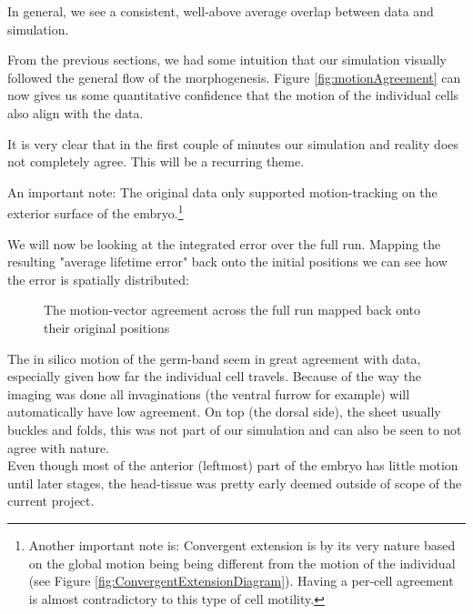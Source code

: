 In general, we see a consistent, well-above average overlap between data and simulation. 

From the previous sections, we had some intuition that our simulation visually followed the general flow of the morphogenesis. Figure \ref{fig:motionAgreement} can now   gives us some quantitative confidence that the motion of the individual cells also align with the data.

It is very clear that in the first couple of minutes our simulation and reality does not completely agree. This will be a recurring theme.

An important note: The original data only supported motion-tracking on the exterior surface of the embryo.\footnote{Another important note is: Convergent extension is by its very nature based on the global motion being being different from the motion of the individual (see Figure \ref{fig:ConvergentExtensionDiagram}). Having a per-cell agreement is almost contradictory to this type of cell motility. 
}

We will now be looking at the integrated error over the full run. Mapping the resulting "average lifetime error" back onto the initial positions we can see how the error is spatially distributed:
\begin{figure}[H]
    \centering
    \caption{The motion-vector agreement across the full run mapped back onto their original positions }
    \label{fig:}
\end{figure}

The in silico motion of the germ-band seem in great agreement with data, especially given how far the individual cell travels.
Because of the way the imaging was done all invaginations (the ventral furrow for example) will automatically have low agreement.
On top (the dorsal side), the sheet usually buckles and folds, this was not part of our simulation and can also be seen to not agree with nature. \\
Even though most of the anterior (leftmost) part of the embryo has little motion until later stages, the head-tissue was pretty early deemed outside of scope of the current project.


